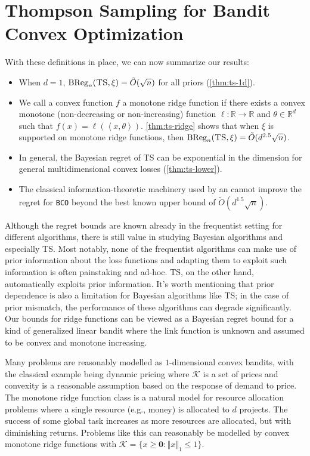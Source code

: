 \documentclass[letter, 12pt]{report}
\newcommand{\R}{\mathbb R}
\newcommand{\ip}[1]{\left \langle #1 \right \rangle}
\newcommand{\BReg}{\textrm{BReg}}
\newcommand{\norm}[1]{\left \Vert  #1 \right \Vert}
\newcommand{\cK}{\mathcal K}
\newcommand{\zeros}{ \bm 0}
\newcommand{\1}{\mathbf{1}}
\newcommand{\bco}{\texttt{BCO}\xspace}
\newcommand{\ts}{\textsc{TS}\xspace}
\theoremstyle{plain}
\theoremstyle{definition}
\theoremstyle{remark}
\begin{document}
\section{Thompson Sampling for Bandit Convex Optimization}
With these definitions in place, we can now summarize our results:
\begin{itemize}
    \item When $d = 1$, $\BReg_n(\ts, \xi) = \tilde O(\sqrt{n})$ for all priors (\cref{thm:ts-1d}).

    \item We call a convex function $f$ a monotone ridge function if there exists a convex monotone (non-decreasing or non-increasing) function $\ell : \R \to \R$ and $\theta \in \R^d$ such that
          $f(x) = \ell(\ip{x, \theta})$.
          \cref{thm:ts-ridge} shows that when $\xi$ is supported on monotone ridge functions, then $\BReg_n(\ts, \xi) = \tilde O(d^{2.5} \sqrt{n})$.

    \item In general, the Bayesian regret of \ts{} can be exponential in the dimension for general multidimensional convex losses (\cref{thm:ts-lower}).

    \item The classical information-theoretic machinery used by \cite{BE18} an \cite{Lat20-cvx} cannot improve
          the regret for \bco beyond the best known upper bound of $\tilde O(d^{1.5} \sqrt{n})$.
\end{itemize}
Although the regret bounds are known already in the frequentist setting for different algorithms, there is still value in studying Bayesian algorithms
and especially \ts.
Most notably, none of the frequentist algorithms can make use of prior information about the loss functions and adapting them to exploit such information
is often painstaking and ad-hoc.
\ts, on the other hand, automatically exploits prior information.
It's worth mentioning that prior dependence is also a limitation for Bayesian algorithms like \ts; in the case of prior mismatch, the performance of these algorithms can degrade significantly.
Our bounds for ridge functions can be viewed as a Bayesian regret bound for a kind of generalized linear bandit where
the link function is unknown and assumed to be convex and monotone
increasing.

Many problems are reasonably modelled as $1$-dimensional convex bandits, with the classical example being dynamic pricing
where $\cK$ is a set of prices and convexity is a reasonable assumption based on the response of demand to price.
The monotone ridge function class is a natural model for resource allocation problems where a single resource (e.g., money) is allocated to $d$ projects.
The success of some global task increases as more resources are allocated, but with diminishing returns. Problems like this can reasonably be modelled
by convex monotone ridge functions with $\cK = \{x \geq \zeros : \norm{x}_1 \leq 1\}$.
\end{document}
